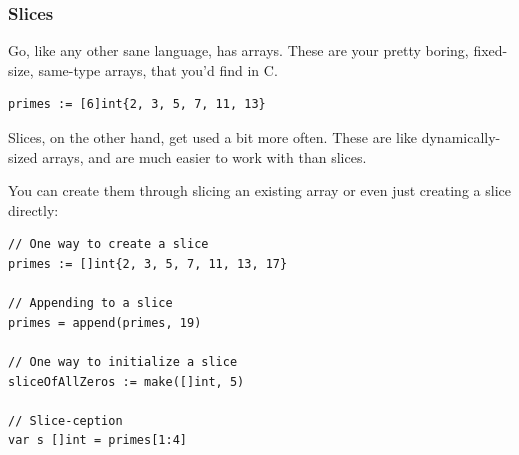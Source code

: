 \documentclass{beamer}
\begin{document}
\begin{frame}[fragile]
\frametitle{Slices}

Go, like any other sane language, has arrays. These are your pretty boring, fixed-size, same-type arrays, that you'd find in C.

\begin{lstlisting}
primes := [6]int{2, 3, 5, 7, 11, 13}
\end{lstlisting}

Slices, on the other hand, get used a bit more often. These are like dynamically-sized arrays, and are much easier to work with than slices.

You can create them through slicing an existing array or even just creating a slice directly:

\begin{lstlisting}
// One way to create a slice
primes := []int{2, 3, 5, 7, 11, 13, 17}

// Appending to a slice
primes = append(primes, 19)

// One way to initialize a slice
sliceOfAllZeros := make([]int, 5)

// Slice-ception
var s []int = primes[1:4]
\end{lstlisting}

\end{frame}
\end{document}
